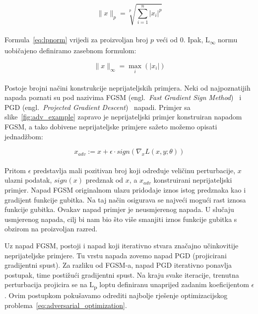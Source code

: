 \documentclass[times, utf8, zavrsni, numeric]{fer}
\begin{document}
\begin{equation}
    \lVert x \rVert_{p} = \sqrt[p]{\sum_{i = 1}^{n}|x_{i}|^p}
    \label{eq:lpnorm}
\end{equation}
\\
Formula~\ref{eq:lpnorm} vrijedi za proizvoljan broj $p$ veći od 0. Ipak, L\textsubscript{$\infty$} normu uobičajeno definiramo zasebnom formulom:

\begin{equation}
    \lVert x \rVert_{\infty} = \max_{i}(|x_{i}|)
    \label{eq:linfnorm}
\end{equation}
\\
Postoje brojni načini konstrukcije neprijateljskih primjera. 
Neki od najpoznatijih napada poznati su pod nazivima FGSM (engl.\ \textit{Fast Gradient Sign Method})~\cite{goodfellow2014explaining} i PGD (engl.\ \textit{Projected Gradient Descent})~\cite{madry2017towards} napadi.
Primjer sa slike~\ref{fig:adv_example} zapravo je neprijateljski primjer konstruiran napadom FGSM, a tako dobivene neprijateljske primjere sažeto možemo opisati jednadžbom:

\begin{equation}
    x_{adv} := x + \epsilon \cdot sign(\nabla_{x}L(x,y;\theta))
    \label{eq:fgsm}
\end{equation}
\\
Pritom $\epsilon$ predstavlja mali pozitivan broj koji određuje veličinu perturbacije, $x$ ulazni podatak, $sign(x)$ predznak od $x$, a $x_{adv}$ konstruirani neprijateljski primjer. 
Napad FGSM originalnom ulazu pridodaje iznos istog predznaka kao i gradijent funkcije gubitka. Na taj način osigurava se najveći mogući rast iznosa funkcije gubitka. 
Ovakav napad primjer je neusmjerenog napada. U slučaju usmjerenog napada, cilj bi nam bio što više smanjiti iznos funkcije gubitka s obzirom na proizvoljan razred.

Uz napad FGSM, postoji i napad koji iterativno stvara značajno učinkovitije neprijateljske primjere. 
Tu vrstu napada zovemo napad PGD (projicirani gradijentni spust). Za razliku od FGSM-a, napad PGD iterativno ponavlja postupak, time postižući gradijentni spust.
Na kraju svake iteracije, trenutna perturbacija projicira se na L\textsubscript{p} loptu definiranu unaprijed zadanim koeficijentom $\epsilon$.
Ovim postupkom pokušavamo odrediti najbolje rješenje optimizacijskog problema~\ref{eq:adversarial_optimization}.
\end{document}
